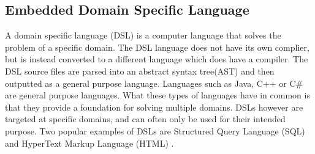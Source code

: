 \iffalse
Additionally, due
to a breakdown in communication between cryptographers
and system implementers, there is evidence that suggests
the way we are using Diffie-Hellman in today’s protocols is
insufficient to protect against state-level actors
\fi
\subsection{Embedded Domain Specific Language}
A domain specific language (DSL) \cite{fowler2010domain} is a computer language that solves the problem of a specific domain. The DSL language does not have its own complier, but is instead converted to a different language which does have a compiler. The DSL source files are parsed into an abstract syntax tree(AST) and then outputted as a general purpose language. Languages such as Java, C++ or C\# are general purpose languages. What these types of languages have in common is that they provide a foundation for solving multiple domains. DSLs however are targeted at specific domains, and can often only be used for their intended purpose. Two popular examples of DSLs are Structured Query Language (SQL) and HyperText Markup Language (HTML) \cite{mernik2005and}.
